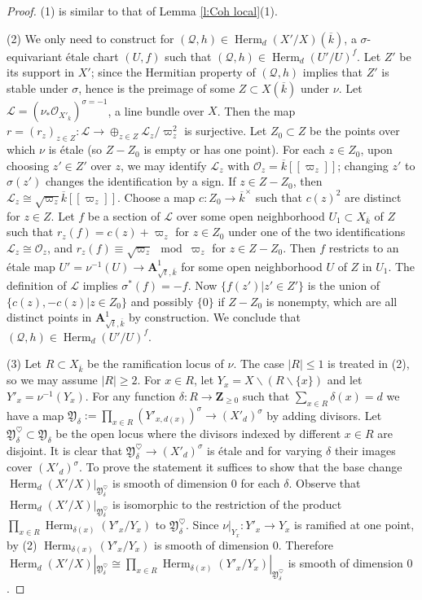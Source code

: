 \documentclass[reqno]{amsart}
\numberwithin{equation}{section}
\newcommand{\Z}{\mathbf{Z}}
\newcommand{\A}{\mathbf{A}}
\newcommand{\bs}{\backslash}
\DeclareMathOperator{\Herm}{Herm}
\newcommand{\SH}{\textup{SkHm}}
\newcommand{\ov}{\overline}
\newcommand\op{\oplus}
\renewcommand\d\delta
\newcommand{\s}{\sigma}
\newcommand{\vp}{\varpi}
\newcommand\hs{\heartsuit}
\newcommand\cL{\mathcal{L}}
\newcommand\cO{\mathcal{O}}
\newcommand\cQ{\mathcal{Q}}
\newcommand\frY{\mathfrak{Y}}
\theoremstyle{remark}
\numberwithin{equation}{section}
\begin{document}
\begin{proof}
(1) is similar to that of Lemma \ref{l:Coh local}(1). 

(2) We only need to construct for $(\cQ,h)\in \Herm_{d}(X'/X)(\ov k)$, a $\s$-equivariant \'etale chart $(U,f)$ such that $(\cQ,h)\in \Herm_{d}(U'/U)^{f}$. Let $Z'$ be its support  in $X'$; since the Hermitian property of $(\cQ, h)$ implies that $Z'$ is stable under $\sigma$, hence is the preimage of some $Z\subset X(\ov k)$ under $\nu$. Let $\cL=(\nu_{*}\cO_{X'_{\ov k}})^{\s=-1}$, a line bundle over $X$. Then the map $r=(r_{z})_{z\in Z}: \cL\to \op_{z\in Z}\cL_{z}/\vp_{z}^{2}$ is surjective. Let $Z_{0}\subset Z$ be the points over which $\nu$ is \'etale (so $Z-Z_{0}$ is empty or has one point). For each $z\in Z_{0}$, upon choosing $z'\in Z'$ over $z$, we may identify $\cL_{z}$ with $\cO_{z}=\ov k[[\vp_{z}]]$; changing $z'$ to $\s(z')$ changes the identification by a sign.  If $z\in Z-Z_{0}$, then $\cL_{z}\cong \sqrt{\vp_{z}}\ov k[[\vp_{z}]]$. Choose a map $c:Z_{0}\to \ov k^{\times}$ such that $c(z)^{2}$ are distinct for $z\in Z$. Let $f$ be a section of $\cL$ over some open neighborhood $U_{1}\subset X_{\ov k}$ of $Z$ such that $r_{z}(f)=c(z)+\vp_{z}$ for $z\in Z_{0}$ under one of the two identifications $\cL_{z}\cong \cO_{z}$, and $r_{z}(f)\equiv\sqrt{\vp_{z}}\mod\vp_{z}$ for $z\in Z-Z_{0}$.  Then $f$ restricts to an \'etale map $U'=\nu^{-1}(U)\to \A^{1}_{\sqrt{t},\ov k}$ for some open neighborhood $U$ of $Z$ in $U_{1}$. The definition of $\cL$ implies $\s^{*}(f)=-f$. Now $\{f(z')|z'\in Z'\}$ is the union of $\{c(z),-c(z)|z\in Z_{0}\}$ and possibly $\{0\}$ if $Z-Z_{0}$ is nonempty, which are all distinct points in $\A^{1}_{\sqrt{t},\ov k}$ by construction. We conclude that $(\cQ,h)\in \Herm_{d}(U'/U)^{f}$. %

(3) Let $R\subset X_{\ov k}$ be the ramification locus of $\nu$. The case $|R|\le 1$ is treated in (2), so we may assume $|R|\ge2$. For $x\in R$, let $Y_{x}=X\bs (R\bs \{x\})$ and let $Y'_{x}=\nu^{-1}(Y_{x})$.   For any function $\d:R\to \Z_{\ge0}$ such that $\sum_{x\in R} \d(x)=d$ we have a map $\frY_{\d}:=\prod_{x\in R}(Y'_{x,d(x)})^{\s}\to (X'_{d})^{\s}$ by adding divisors. Let $\frY_{\d}^{\hs}\subset \frY_{\d}$ be the open locus where the divisors indexed by different $x\in R$ are disjoint. It is clear that $\frY^{\hs}_{\d}\to (X'_{d})^{\s}$ is \'etale and for varying $\d$ their images cover $(X'_{d})^{\s}$. To prove the statement it suffices to show that the base change $\Herm_{d}(X'/X)|_{\frY_{\d}^{\hs}}$ is smooth of dimension $0$ for each $\d$. Observe that $\Herm_{d}(X'/X)|_{\frY_{\d}^{\hs}}$ is isomorphic to the restriction of the product $\prod_{x\in R}\Herm_{\d(x)}(Y'_{x}/Y_{x})$ to $\frY_{\d}^{\hs}$. Since $\nu|_{Y_{x}}: Y'_{x}\to Y_{x}$ is ramified at one point, by (2) $\Herm_{\d(x)}(Y'_{x}/Y_{x})$ is smooth of dimension $0$. Therefore $\Herm_{d}(X'/X)|_{\frY_{\d}^{\hs}}\cong \prod_{x\in R}\Herm_{\d(x)}(Y'_{x}/Y_{x})|_{\frY_{\d}^{\hs}}$ is smooth of dimension $0$.  
\end{proof}
\end{document}

